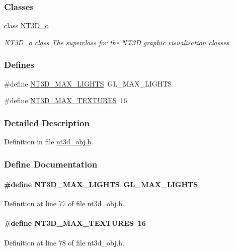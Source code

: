 \subsubsection*{Classes}
\begin{DoxyCompactItemize}
\item 
class \hyperlink{class_n_t3_d__o}{NT3D\_\-o}
\begin{DoxyCompactList}\small\item\em \hyperlink{class_n_t3_d__o}{NT3D\_\-o} class The superclass for the NT3D graphic visualisation classes. \item\end{DoxyCompactList}\end{DoxyCompactItemize}
\subsubsection*{Defines}
\begin{DoxyCompactItemize}
\item 
\#define \hyperlink{nt3d__obj_8h_a7044afc27930d55417b569810f99a990}{NT3D\_\-MAX\_\-LIGHTS}~GL\_\-MAX\_\-LIGHTS
\item 
\#define \hyperlink{nt3d__obj_8h_ad4e1b450c85b085102e49e33d55486b9}{NT3D\_\-MAX\_\-TEXTURES}~16
\end{DoxyCompactItemize}


\subsubsection{Detailed Description}


Definition in file \hyperlink{nt3d__obj_8h_source}{nt3d\_\-obj.h}.



\subsubsection{Define Documentation}
\paragraph[{NT3D\_\-MAX\_\-LIGHTS}]{\setlength{\rightskip}{0pt plus 5cm}\#define NT3D\_\-MAX\_\-LIGHTS~GL\_\-MAX\_\-LIGHTS}\hfill\label{nt3d__obj_8h_a7044afc27930d55417b569810f99a990}


Definition at line 77 of file nt3d\_\-obj.h.

\paragraph[{NT3D\_\-MAX\_\-TEXTURES}]{\setlength{\rightskip}{0pt plus 5cm}\#define NT3D\_\-MAX\_\-TEXTURES~16}\hfill\label{nt3d__obj_8h_ad4e1b450c85b085102e49e33d55486b9}


Definition at line 78 of file nt3d\_\-obj.h.

